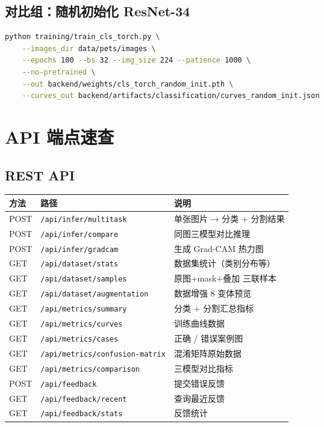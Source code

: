 \documentclass[12pt, a4paper, openany]{ctexbook}
\begin{document}
\section{对比组：随机初始化 ResNet-34}

\begin{lstlisting}[language=bash]
python training/train_cls_torch.py \
    --images_dir data/pets/images \
    --epochs 100 --bs 32 --img_size 224 --patience 1000 \
    --no-pretrained \
    --out backend/weights/cls_torch_random_init.pth \
    --curves_out backend/artifacts/classification/curves_random_init.json
\end{lstlisting}

\appendix
\chapter{API 端点速查}

\section{REST API}

\begin{center}
\begin{tabular}{llL{6cm}}
  \toprule
  \textbf{方法} & \textbf{路径} & \textbf{说明} \\
  \midrule
  POST & \texttt{/api/infer/multitask}            & 单张图片 → 分类 + 分割结果 \\
  POST & \texttt{/api/infer/compare}              & 同图三模型对比推理 \\
  POST & \texttt{/api/infer/gradcam}              & 生成 Grad-CAM 热力图 \\
  GET  & \texttt{/api/dataset/stats}              & 数据集统计（类别分布等） \\
  GET  & \texttt{/api/dataset/samples}            & 原图+mask+叠加 三联样本 \\
  GET  & \texttt{/api/dataset/augmentation}       & 数据增强 8 变体预览 \\
  GET  & \texttt{/api/metrics/summary}            & 分类 + 分割汇总指标 \\
  GET  & \texttt{/api/metrics/curves}             & 训练曲线数据 \\
  GET  & \texttt{/api/metrics/cases}              & 正确 / 错误案例图 \\
  GET  & \texttt{/api/metrics/confusion-matrix}   & 混淆矩阵原始数据 \\
  GET  & \texttt{/api/metrics/comparison}         & 三模型对比指标 \\
  POST & \texttt{/api/feedback}                   & 提交错误反馈 \\
  GET  & \texttt{/api/feedback/recent}            & 查询最近反馈 \\
  GET  & \texttt{/api/feedback/stats}             & 反馈统计 \\
  \bottomrule
\end{tabular}
\end{center}
\end{document}
